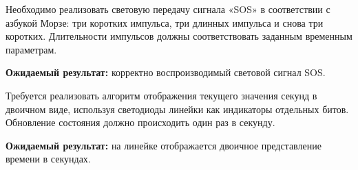 \begin{taskbox}
\indent Необходимо реализовать световую передачу сигнала «SOS» в соответствии с азбукой Морзе: три коротких импульса, три длинных импульса и снова три коротких. Длительности импульсов должны соответствовать заданным временным параметрам.

\noindent\textbf{Ожидаемый результат:} корректно воспроизводимый световой сигнал SOS.
\end{taskbox}

\begin{taskbox}
\indent Требуется реализовать алгоритм отображения текущего значения секунд в двоичном виде, используя светодиоды линейки как индикаторы отдельных битов. Обновление состояния должно происходить один раз в секунду.

\noindent\textbf{Ожидаемый результат:} на линейке отображается двоичное представление времени в секундах.
\end{taskbox}
